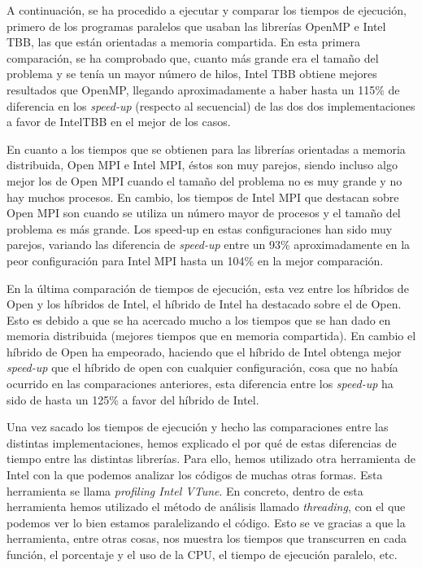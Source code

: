 \documentclass[a4paper,12pt]{article}
\begin{document}
A continuación, se ha procedido a ejecutar y comparar los tiempos de ejecución, primero de los programas paralelos que usaban las librerías OpenMP e Intel TBB, las que están orientadas a memoria compartida. En esta primera comparación, se ha comprobado que, cuanto más grande era el tamaño del problema y se tenía un mayor número de hilos, Intel TBB obtiene mejores resultados que OpenMP, llegando aproximadamente a haber hasta un 115\% de diferencia en los {\it speed-up} (respecto al secuencial) de las dos dos implementaciones a favor de IntelTBB en el mejor de los casos.

En cuanto a los tiempos que se obtienen para las librerías orientadas a memoria distribuida, Open MPI e Intel MPI, éstos son muy parejos, siendo incluso algo mejor los de Open MPI cuando el tamaño del problema no es muy grande y no hay muchos procesos. En cambio, los tiempos de Intel MPI que destacan sobre Open MPI son cuando se utiliza un número mayor de procesos y el tamaño del problema es más grande. Los speed-up en estas configuraciones han sido muy parejos, variando las diferencia de {\it speed-up} entre un 93\% aproximadamente en la peor configuración para Intel MPI hasta un 104\% en la mejor comparación.

En la última comparación de tiempos de ejecución, esta vez entre los híbridos de Open y los híbridos de Intel, el híbrido de Intel ha destacado sobre el de Open. Esto es debido a que se ha acercado mucho a los tiempos que se han dado en memoria distribuida (mejores tiempos que en memoria compartida). En cambio el híbrido de Open ha empeorado, haciendo que el híbrido de Intel obtenga mejor {\it speed-up} que el híbrido de open con cualquier configuración, cosa que no había ocurrido en las comparaciones anteriores, esta diferencia entre los {\it speed-up} ha sido de hasta un 125\% a favor del híbrido de Intel.

Una vez sacado los tiempos de ejecución y hecho las comparaciones entre las distintas implementaciones, hemos explicado el por qué de estas diferencias de tiempo entre las distintas librerías. Para ello, hemos utilizado otra herramienta de Intel con la que podemos analizar los códigos de muchas otras formas. Esta herramienta se llama {\it profiling Intel VTune}. En concreto, dentro de esta herramienta hemos utilizado el método de análisis llamado {\it threading}, con el que podemos ver lo bien estamos paralelizando el código. Esto se ve gracias a que la herramienta, entre otras cosas, nos muestra los tiempos que transcurren en cada función, el porcentaje y el uso de la CPU, el tiempo de ejecución paralelo, etc.
\end{document}
